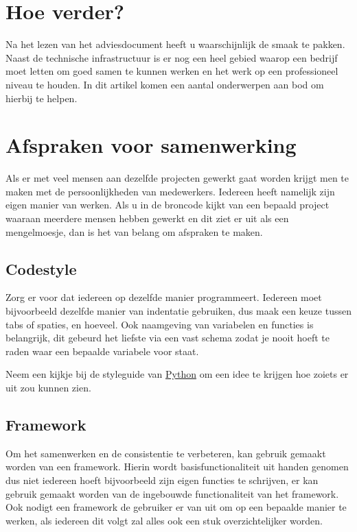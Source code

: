 \documentclass[12pt, a4paper]{article}
\begin{document}
\section*{Hoe verder?}

Na het lezen van het adviesdocument heeft u waarschijnlijk de smaak te pakken. Naast de technische infrastructuur is er nog een heel gebied waarop een bedrijf moet letten om goed samen te kunnen werken en het werk op een professioneel niveau te houden. In dit artikel komen een aantal onderwerpen aan bod om hierbij te helpen.

\section{Afspraken voor samenwerking}

Als er met veel mensen aan dezelfde projecten gewerkt gaat worden krijgt men te maken met de persoonlijkheden van medewerkers. Iedereen heeft namelijk zijn eigen manier van werken. Als u in de broncode kijkt van een bepaald project waaraan meerdere mensen hebben gewerkt en dit ziet er uit als een mengelmoesje, dan is het van belang om afspraken te maken.

\subsection{Codestyle}

Zorg er voor dat iedereen op dezelfde manier programmeert. Iedereen moet bijvoorbeeld dezelfde manier van indentatie gebruiken, dus maak een keuze tussen tabs of spaties, en hoeveel. Ook naamgeving van variabelen en functies is belangrijk, dit gebeurd het liefste via een vast schema zodat je nooit hoeft te raden waar een bepaalde variabele voor staat.

Neem een kijkje bij de styleguide van \href{http://www.python.org/dev/peps/pep-0008/}{Python} om een idee te krijgen hoe zoiets er uit zou kunnen zien.

\subsection{Framework}

Om het samenwerken en de consistentie te verbeteren, kan gebruik gemaakt worden van een framework. Hierin wordt basisfunctionaliteit uit handen genomen dus niet iedereen hoeft bijvoorbeeld zijn eigen functies te schrijven, er kan gebruik gemaakt worden van de ingebouwde functionaliteit van het framework. Ook nodigt een framework de gebruiker er van uit om op een bepaalde manier te werken, als iedereen dit volgt zal alles ook een stuk overzichtelijker worden.
\end{document}
